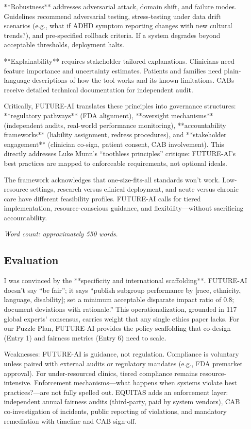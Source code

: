\documentclass[12pt,twoside]{article}
\begin{document}
**Robustness** addresses adversarial attack, domain shift, and failure modes. Guidelines recommend adversarial testing, stress-testing under data drift scenarios (e.g., what if ADHD symptom reporting changes with new cultural trends?), and pre-specified rollback criteria. If a system degrades beyond acceptable thresholds, deployment halts.

**Explainability** requires stakeholder-tailored explanations. Clinicians need feature importance and uncertainty estimates. Patients and families need plain-language descriptions of how the tool works and its known limitations. CABs receive detailed technical documentation for independent audit.

Critically, FUTURE-AI translates these principles into governance structures: **regulatory pathways** (FDA alignment), **oversight mechanisms** (independent audits, real-world performance monitoring), **accountability frameworks** (liability assignment, redress procedures), and **stakeholder engagement** (clinician co-sign, patient consent, CAB involvement). This directly addresses Luke Munn's ``toothless principles'' critique: FUTURE-AI's best practices are mapped to enforceable requirements, not optional ideals.

The framework acknowledges that one-size-fits-all standards won't work. Low-resource settings, research versus clinical deployment, and acute versus chronic care have different feasibility profiles. FUTURE-AI calls for tiered implementation, resource-conscious guidance, and flexibility—without sacrificing accountability.

\emph{Word count: approximately 550 words.}

\subsection*{Evaluation}

I was convinced by the **specificity and international scaffolding**. FUTURE-AI doesn't say ``be fair''; it says ``publish subgroup performance by [race, ethnicity, language, disability]; set a minimum acceptable disparate impact ratio of 0.8; document deviations with rationale.'' This operationalization, grounded in 117 global experts' consensus, carries weight that any single ethics paper lacks. For our Puzzle Plan, FUTURE-AI provides the policy scaffolding that co-design (Entry 1) and fairness metrics (Entry 6) need to scale.

Weaknesses: FUTURE-AI is guidance, not regulation. Compliance is voluntary unless paired with external audits or regulatory mandates (e.g., FDA premarket approval). For under-resourced clinics, tiered compliance remains resource-intensive. Enforcement mechanisms—what happens when systems violate best practices?—are not fully spelled out. EQUITAS adds an enforcement layer: independent annual fairness audits (third-party, paid by system vendors), CAB co-investigation of incidents, public reporting of violations, and mandatory remediation with timeline and CAB sign-off.
\end{document}
